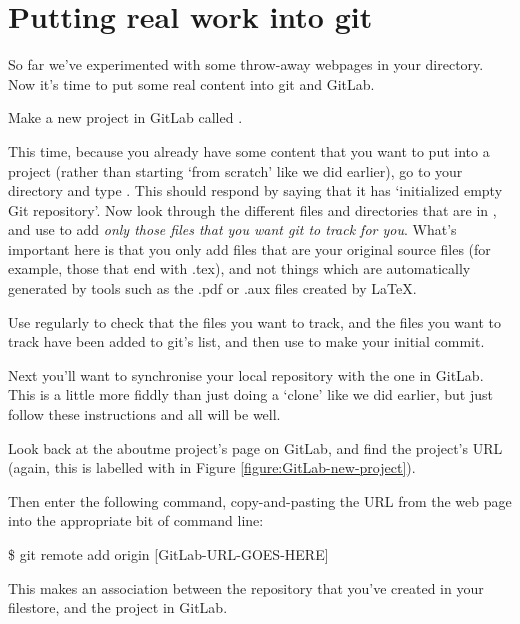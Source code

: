\section{Putting real work into git}

So far we've experimented with some throw-away webpages in your  directory. Now it's time to put some real content into git and GitLab.


Make a new project in GitLab called . 

This time, because you already have some content that you want to put into a project (rather than starting `from scratch' like we did earlier), go to your  directory and type . This should respond by saying that it has `initialized empty Git repository'. Now look through the different files and directories that are in , and use  to add \emph{only those files that you want git to track for you}. What's important here is that you only add files that are your original source files (for example, those that end with .tex), and not things which are automatically generated by tools such as the .pdf or .aux files created by LaTeX.

Use  regularly to check that the files you want to track, and  the files you want to track have been added to git's list, and then use  to make your initial commit. 

Next you'll want to synchronise your local repository with the one in GitLab. This is a little more fiddly than just doing a `clone' like we did earlier, but just follow these instructions and all will be well.
 
Look back at the aboutme project's page on GitLab, and find the  project's URL (again, this is labelled with \protect{} in Figure \ref{figure:GitLab-new-project}).

Then enter the following command, copy-and-pasting the URL from the web page into the appropriate bit of command line:

\begin{ttoutenv}
\$ git remote add origin [GitLab-URL-GOES-HERE]
\end{ttoutenv}

This makes an association between the repository that you've created in your filestore, and the project in GitLab.

